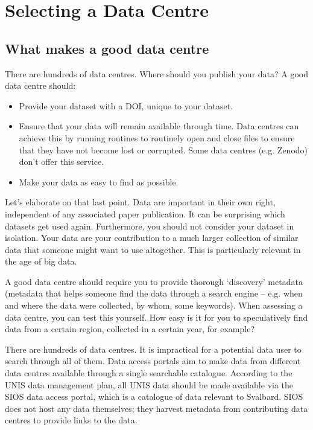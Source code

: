 \documentclass[a4paper,12pt]{article}
\begin{document}
\section{Selecting a Data Centre}

\subsection{What makes a good data centre}

There are hundreds of data centres. Where should you publish your data? A good data centre should:
\begin{itemize}
    \item Provide your dataset with a DOI, unique to your dataset.
    \item Ensure that your data will remain available through time. Data centres can achieve this by running routines to routinely open and close files to ensure that they have not become lost or corrupted. Some data centres (e.g. Zenodo) don’t offer this service.
    \item Make your data as easy to find as possible.
\end{itemize}

Let’s elaborate on that last point. Data are important in their own right, independent of any associated paper publication. It can be surprising which datasets get used again. Furthermore, you should not consider your dataset in isolation. Your data are your contribution to a much larger collection of similar data that someone might want to use altogether. This is particularly relevant in the age of big data.

A good data centre should require you to provide thorough `discovery’ metadata (metadata that helps someone find the data through a search engine – e.g. when and where the data were collected, by whom, some keywords). When assessing a data centre, you can test this yourself. How easy is it for you to speculatively find data from a certain region, collected in a certain year, for example?

There are hundreds of data centres. It is impractical for a potential data user to search through all of them. Data access portals aim to make data from different data centres available through a single searchable catalogue. According to the UNIS data management plan, all UNIS data should be made available via the SIOS data access portal, which is a catalogue of data relevant to Svalbard. SIOS does not host any data themselves; they harvest metadata from contributing data centres to provide links to the data.
\end{document}
